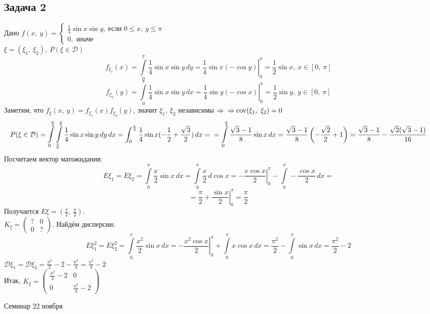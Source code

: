 \documentclass[12pt, a4paper]{article}
\newcommand{\cov}{\operatorname{cov}}
\begin{document}
    \subsection*{Задача 2}
    Дано $f(x,\ y) = \begin{cases}
        \frac{1}{4}\sin x \sin y,\ \text{если } 0\leq x,\ y \leq \pi\\
        0, \text{ иначе}
    \end{cases}$\\
    $\xi = (\xi_1,\ \xi_2),\ P(\xi\in \mathcal{D})$
    \[f_{\xi_1}(x) = \int\limits_0^{\pi} \frac{1}{4}\sin x \sin y\, dy = \left.\frac{1}{4}\sin x (-\cos y)\right|_0^{\pi} = \frac{1}{2}\sin x,\ x\in [0,\ \pi]\]
    \[f_{\xi_2}(y) = \int\limits_0^{\pi} \frac{1}{4}\sin x \sin y\, dx = \left.\frac{1}{4}\sin y (-\cos x)\right|_0^{\pi} = \frac{1}{2}\sin y,\ y\in [0,\ \pi]\]
    Заметим, что $f_{\xi}(x,\ y) = f_{\xi_1}(x) f_{\xi_2}(y)$, значит $\xi_1,\ \xi_2$ независимы $\Rightarrow\\
    \Rightarrow\cov(\xi_1,\ \xi_2) = 0$\\
    \[\displaystyle P(\xi \in \mathcal{D}) = \int\limits_{0}^{\frac{\pi}{4}}\int\limits_{\frac{\pi}{6}}^{\frac{\pi}{3}} \frac{1}{4}\sin x \sin y\, dy \, dx = \int_0^{\frac{\pi}{4}} \frac{1}{4}\sin x(-\frac{1}{2} + \frac{\sqrt{3}}{2})\, dx =\\
    = \int\limits_0^{\frac{\pi}{4}} \frac{\sqrt{3} - 1}{8} \sin x \, dx = \frac{\sqrt{3} - 1}{8}\left(-\frac{\sqrt{2}}{2} + 1\right) = \frac{\sqrt{3} - 1}{8} - \frac{\sqrt{2}(\sqrt{3} - 1)}{16}\]
    Посчитаем вектор матожидания:\\
    \[E\xi_1 = E\xi_2 = \int\limits_0^{\pi} \frac{x}{2}\sin x\, dx = \int\limits_0^{\pi}\frac{x}{2}\, d\cos x = \left.-\frac{x\cos x}{2}\right|_0^{\pi} - \int\limits_0^{\pi} -\frac{\cos x}{2}\, dx =\]
    \[= \frac{\pi}{2} + \left.\frac{\sin x}{2}\right|_0^{\pi} = \frac{\pi}{2}\]
    Получается $E\xi = (\frac{\pi}{2},\ \frac{\pi}{2})$.\\
    $K_{\xi} = \begin{pmatrix}
        ? & 0\\
        0 & ?
    \end{pmatrix}$. Найдём дисперсии:
    \[E\xi_1^2 = E\xi_2^2 = \int\limits_0^{\pi} \frac{x^2}{2} \sin x\, dx = \left.-\frac{x^2\cos x}{2}\right|_0^{\pi} + \int\limits_0^{\pi}x\cos x\, dx = \frac{\pi^2}{2} - \int\limits_0^{\pi} \sin x \, dx = \frac{\pi^2}{2} - 2\]
    $\mathcal{D}\xi_1 = \mathcal{D}\xi_2 = \frac{\pi^2}{2} - 2 - \frac{\pi^2}{4} = \frac{\pi^2}{4} - 2$\\
    Итак, $K_{\xi} = \begin{pmatrix}
        \frac{\pi^2}{4} - 2 & 0\\
        0 & \frac{\pi^2}{4} - 2
    \end{pmatrix}$
    \begin{center}
        Семинар 22 ноября
    \end{center}
\end{document}
